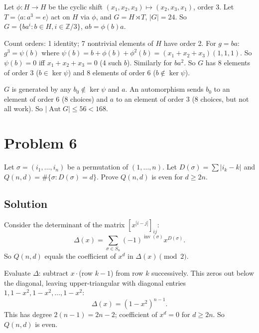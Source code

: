 \documentclass{article}
\begin{document}
Let $\phi : H \to H$ be the cyclic shift $(x_1, x_2, x_3) \mapsto (x_2, x_3, x_1)$, order 3. Let $T = \langle a : a^3 = e\rangle$ act on $H$ via $\phi$, and $G = H \rtimes T$, $|G| = 24$. So $G = \{ba^i : b \in H, i \in \mathbb{Z}/3\}$, $ab = \phi(b)a$.

Count orders: 1 identity; 7 nontrivial elements of $H$ have order 2. For $g = ba$: $g^3 = \psi(b)$ where $\psi(b) = b + \phi(b) + \phi^2(b) = (x_1+x_2+x_3)(1,1,1)$. So $\psi(b) = 0$ iff $x_1 + x_2 + x_3 = 0$ (4 such $b$). Similarly for $ba^2$. So $G$ has $8$ elements of order 3 ($b \in \ker \psi$) and $8$ elements of order 6 ($b \notin \ker \psi$).

$G$ is generated by any $b_0 \notin \ker\psi$ and $a$. An automorphism sends $b_0$ to an element of order 6 (8 choices) and $a$ to an element of order 3 (8 choices, but not all work). So $|\operatorname{Aut} G| \le 56 < 168$.

\section*{Problem 6}
Let $\sigma = (i_1, \ldots, i_n)$ be a permutation of $(1, \ldots, n)$. Let $D(\sigma) = \sum |i_k - k|$ and $Q(n, d) = \#\{\sigma : D(\sigma) = d\}$. Prove $Q(n, d)$ is even for $d \ge 2n$.

\subsection*{Solution}
Consider the determinant of the matrix $[x^{|i - j|}]_{ij}$:
\[
\Delta(x) = \sum_{\sigma \in S_n} (-1)^{\operatorname{inv}(\sigma)} x^{D(\sigma)}.
\]
So $Q(n, d)$ equals the coefficient of $x^d$ in $\Delta(x) \pmod 2$.

Evaluate $\Delta$: subtract $x \cdot$(row $k-1$) from row $k$ successively. This zeros out below the diagonal, leaving upper-triangular with diagonal entries $1, 1 - x^2, 1 - x^2, \ldots, 1 - x^2$:
\[
\Delta(x) = (1 - x^2)^{n-1}.
\]
This has degree $2(n-1) = 2n - 2$; coefficient of $x^d = 0$ for $d \ge 2n$. So $Q(n, d)$ is even.
\end{document}
